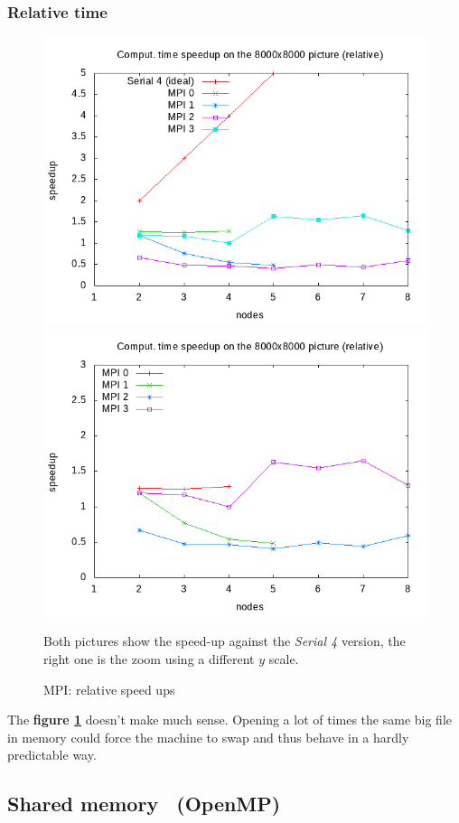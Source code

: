\documentclass[10pt,a4paper]{article}
\begin{document}
\subsubsection{Relative time}

\begin{figure}[ht]
\begin{center}
\includegraphics[width=.45\linewidth]{../../plots/mpi_speedup_compute_8000_relative.png}
\includegraphics[width=.45\linewidth]{../../plots/mpi_speedup_compute_8000_no_ideal_relative.png}
\end{center}
\caption{MPI: relative speed ups}{Both pictures show the speed-up against the
\emph{Serial 4} version, the right one is the zoom using a different $y$ scale.}
\label{fig:mpis-rel}
\end{figure}

The \textbf{figure \ref{fig:mpis-rel}} doesn't make much sense. Opening a lot
of times the same big file in memory could force the machine to swap and thus
behave in a hardly predictable way.

\subsection{Shared memory ~(OpenMP)}
\end{document}
